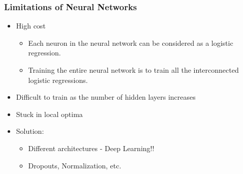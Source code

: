 \begin{frame}[fragile] \frametitle{Limitations of Neural Networks}
\begin{itemize}
\item High cost
\begin{itemize}
\item Each neuron in the neural network can be considered as a logistic regression.
\item Training the entire neural network is to train all the interconnected logistic regressions.
\end{itemize}
\item Difficult to train as the number of hidden layers increases
\item Stuck in local optima
\item Solution:
\begin{itemize}
\item Different architectures - Deep Learning!!
\item Dropouts, Normalization, etc.
\end{itemize}
\end{itemize}
\end{frame}


%
%
%
%
